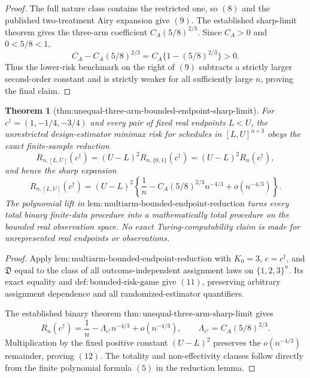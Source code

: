 \documentclass{article}
\newtheorem{theorem}{Theorem}
\begin{document}
{\begin{proof}
The full nature class contains the restricted one, so \((8)\) and the published two-treatment Airy expansion give \((9)\).  The established sharp-limit theorem gives the three-arm coefficient \(C_A(5/8)^{2/3}\).  Since \(C_A>0\) and \(0<5/8<1\),
\[
 C_A-C_A(5/8)^{2/3}
 =C_A\{1-(5/8)^{2/3}\}>0.
\]
Thus the lower-risk benchmark on the right of \((9)\) subtracts a strictly larger second-order constant and is strictly weaker for all sufficiently large \(n\), proving the final claim.
\end{proof}

\begin{theorem}[thm:unequal-three-arm-bounded-endpoint-sharp-limit]\label{thm:unequal-three-arm-bounded-endpoint-sharp-limit}
For \(c^\dagger=(1,-1/4,-3/4)\) and every pair of fixed real endpoints \(L<U\), the unrestricted design-estimator minimax risk for schedules in \([L,U]^{n\times3}\) obeys the exact finite-sample reduction
\[
 R_{n,[L,U]}(c^\dagger)
 =(U-L)^2R_{n,\{0,1\}}(c^\dagger)
 =(U-L)^2R_n(c^\dagger),
\tag{11}
\]
and hence the sharp expansion
\[
 R_{n,[L,U]}(c^\dagger)
 =(U-L)^2\left\{
 \frac1n-C_A(5/8)^{2/3}n^{-4/3}+o(n^{-4/3})
 \right\}.
\tag{12}
\]
The polynomial lift in \(\mathrm{lem:multiarm\text{-}bounded\text{-}endpoint\text{-}reduction}\) turns every total binary finite-data procedure into a mathematically total procedure on the bounded real observation space.  No exact Turing-computability claim is made for unrepresented real endpoints or observations.
\end{theorem}
\begin{proof}
Apply \(\mathrm{lem:multiarm\text{-}bounded\text{-}endpoint\text{-}reduction}\) with \(K_0=3\), \(c=c^\dagger\), and \(\mathfrak D\) equal to the class of all outcome-independent assignment laws on \(\{1,2,3\}^n\).  Its exact equality and \(\mathrm{def:bounded\text{-}risk\text{-}game}\) give \((11)\), preserving arbitrary assignment dependence and all randomized-estimator quantifiers.

The established binary theorem \(\mathrm{thm:unequal\text{-}three\text{-}arm\text{-}sharp\text{-}limit}\) gives
\[
 R_n(c^\dagger)
 =\frac1n-\Lambda_{c^\dagger}n^{-4/3}+o(n^{-4/3}),
 \qquad
 \Lambda_{c^\dagger}=C_A(5/8)^{2/3}.
\]
Multiplication by the fixed positive constant \((U-L)^2\) preserves the \(o(n^{-4/3})\) remainder, proving \((12)\).  The totality and non-effectivity clauses follow directly from the finite polynomial formula \((5)\) in the reduction lemma.
\end{proof}

}
\end{document}
